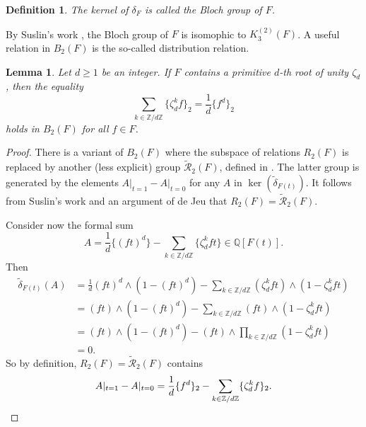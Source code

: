 \documentclass[11pt,a4,leqno]{amsart}
\theoremstyle{my theoremstyle}
\newtheorem{lem}[thm]{Lemma}
\theoremstyle{dfn}
\newtheorem{dfn}[thm]{Definition}
\theoremstyle{remark}
\renewcommand{\1}{\mathbbm{1}}
\newcommand{\Z}{\mathbb{Z}}
\newcommand{\Q}{\mathbb{Q}}
\newcommand{\z}{\zeta}
\numberwithin{equation}{section}
\begin{document}
\begin{dfn}
    The kernel of $\delta_F$ is called the Bloch group of $F$.
\end{dfn}

By Suslin's work \cite{Sus90}, the Bloch group of $F$ is isomophic to $K_3^{(2)}(F)$.
A useful relation in $B_2(F)$ is the so-called distribution relation.

\begin{lem}\label{rel2}
    Let $d \geqslant 1$ be an integer. If $F$ contains a primitive $d$-th root of unity $\z_d$, then the equality
            \begin{equation*}
                \sum_{k \in \Z/d\Z} \{\zeta_d^k f\}_2 = \dfrac1{d} \{f^d\}_2 
            \end{equation*}
        holds in $B_2(F)$ for all $f\in F$.
\end{lem}

\begin{proof}
There is a variant of $B_2(F)$ where the subspace of relations $R_2(F)$ is replaced by another (less explicit) group $\tilde{\mathcal{R}}_2(F)$, defined in \cite[Remark, p.~226]{Goncharov}. The latter group is generated by the elements $A\rvert_{t=1} - A\rvert_{t=0}$ for any $A$ in $\ker(\tilde{\delta}_{F(t)})$. It follows from Suslin's work \cite{Sus90} and an argument of de Jeu \cite[Remark 5.3]{Jeu00} that $R_2(F) = \tilde{\mathcal{R}}_2(F)$.

Consider now the formal sum
\begin{equation*}
    A = \frac{1}{d} \{(ft)^d\} - \sum_{k \in \Z/d\Z} \{\zeta_d^k ft\} \in \Q[F(t)].
\end{equation*}
Then
\begin{align*}
    \tilde{\delta}_{F(t)}(A) & = \frac{1}{d} (ft)^d \wedge (1-(ft)^d) - \sum_{k \in \Z/d\Z} (\zeta_d^k ft) \wedge (1-\zeta_d^k ft) \\
    & = (ft) \wedge (1-(ft)^d) - \sum_{k \in \Z/d\Z} (ft) \wedge (1-\zeta_d^k ft) \\
    & = (ft) \wedge (1-(ft)^d) - (ft) \wedge \prod_{k \in \Z/d\Z} (1-\zeta_d^k ft) \\
    & = 0.
\end{align*}
So by definition, $R_2(F) = \tilde{\mathcal{R}}_2(F)$ contains
\begin{equation*}
    A \rvert_{t=1} - A \rvert_{t=0} = \frac{1}{d} \{f^d\}_2 - \sum_{k \in \Z/d\Z} \{\zeta_d^k f\}_2. \qedhere
\end{equation*}
\end{proof}
\end{document}
